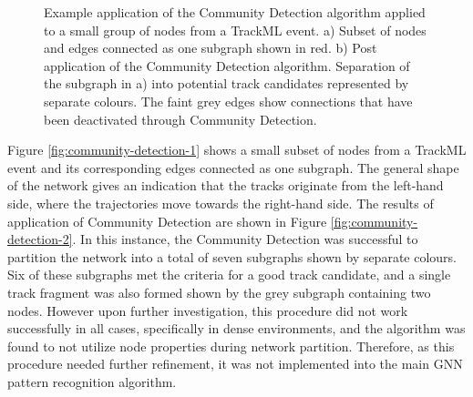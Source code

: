 \begin{figure}[htbp!] 
    \centering
    \hfill%
    \caption{Example application of the Community Detection algorithm applied to a small group of nodes from a TrackML event. a) Subset of nodes and edges connected as one subgraph shown in red. b) Post application of the Community Detection algorithm. Separation of the subgraph in a) into potential track candidates represented by separate colours. The faint grey edges show connections that have been deactivated through Community Detection.}
    \label{fig:community-detection}
\end{figure}

Figure \ref{fig:community-detection-1} shows a small subset of nodes from a TrackML event and its corresponding edges connected as one subgraph. The general shape of the network gives an indication that the tracks originate from the left-hand side, where the trajectories move towards the right-hand side. The results of application of Community Detection are shown in Figure \ref{fig:community-detection-2}. In this instance, the Community Detection was successful to partition the network into a total of seven subgraphs shown by separate colours. Six of these subgraphs met the criteria for a good track candidate, and a single track fragment was also formed shown by the grey subgraph containing two nodes. However upon further investigation, this procedure did not work successfully in all cases, specifically in dense environments, and the algorithm was found to not utilize node properties during network partition. Therefore, as this procedure needed further refinement, it was not implemented into the main GNN pattern recognition algorithm. 

